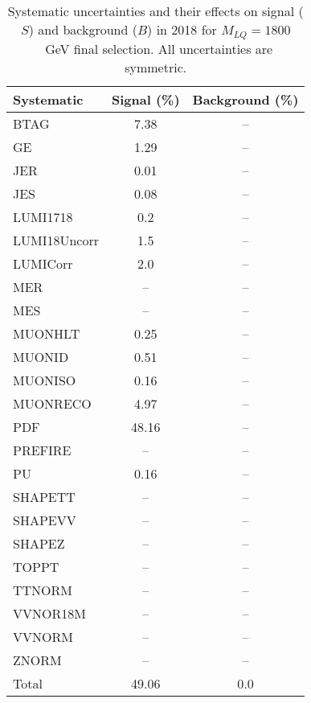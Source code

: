 \begin{table}[htbp]
\begin{center}
\caption{Systematic uncertainties and their effects on signal ($S$) and background ($B$) in 2018 for $M_{LQ}=1800$~GeV final selection. All uncertainties are symmetric.}
\begin{tabular}{lcc}
\hline\hline
Systematic & Signal (\%) & Background (\%) \\ \hline 
BTAG & 7.38 & --\\ 
GE & 1.29 & --\\ 
JER & 0.01 & --\\ 
JES & 0.08 & --\\ 
LUMI1718 & 0.2 & --\\ 
LUMI18Uncorr & 1.5 & --\\ 
LUMICorr & 2.0 & --\\ 
MER & -- & --\\ 
MES & -- & --\\ 
MUONHLT & 0.25 & --\\ 
MUONID & 0.51 & --\\ 
MUONISO & 0.16 & --\\ 
MUONRECO & 4.97 & --\\ 
PDF & 48.16 & --\\ 
PREFIRE & -- & --\\ 
PU & 0.16 & --\\ 
SHAPETT & -- & --\\ 
SHAPEVV & -- & --\\ 
SHAPEZ & -- & --\\ 
TOPPT & -- & --\\ 
TTNORM & -- & --\\ 
VVNOR18M & -- & --\\ 
VVNORM & -- & --\\ 
ZNORM & -- & --\\ 
Total & 49.06 & 0.0\\ \hline \hline
\end{tabular}
\label{tab:SysUncertainties_uujj_1800}
\end{center}
\end{table}

